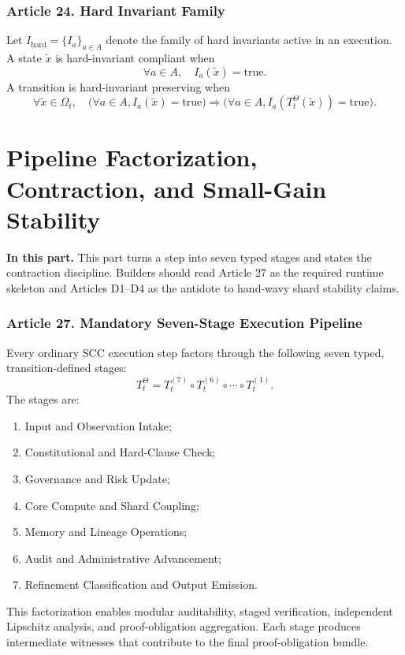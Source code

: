 \documentclass[10pt,oneside]{article}
\theoremstyle{definition}
\theoremstyle{remark}
\newcommand{\PartIntro}[1]{\noindent\textbf{In this part.} #1\par\medskip}
\begin{document}
\section{Article 24. Hard Invariant Family}
Let \(I_{\mathrm{hard}}=\{I_a\}_{a\in A}\) denote the family of hard invariants active in an execution. A state \(\widetilde{x}\) is hard-invariant compliant when
\[
\forall a\in A,\quad I_a(\widetilde{x})=\mathrm{true}.
\]
A transition is hard-invariant preserving when
\[
\forall \widetilde{x}\in\Omega_t,\quad \bigl(\forall a\in A, I_a(\widetilde{x})=\mathrm{true}\bigr)\Longrightarrow \bigl(\forall a\in A, I_a(T_t^\Theta(\widetilde{x}))=\mathrm{true}\bigr).
\]

\part{Pipeline Factorization, Contraction, and Small-Gain Stability}

\PartIntro{This part turns a step into seven typed stages and states the contraction discipline. Builders should read Article 27 as the required runtime skeleton and Articles D1--D4 as the antidote to hand-wavy shard stability claims.}

\section{Article 27. Mandatory Seven-Stage Execution Pipeline}
Every ordinary SCC execution step factors through the following seven typed, transition-defined stages:
\[
T_t^\Theta=T_t^{(7)}\circ T_t^{(6)}\circ\cdots\circ T_t^{(1)}.
\]
The stages are:
\begin{enumerate}
  \item Input and Observation Intake;
  \item Constitutional and Hard-Clause Check;
  \item Governance and Risk Update;
  \item Core Compute and Shard Coupling;
  \item Memory and Lineage Operations;
  \item Audit and Administrative Advancement;
  \item Refinement Classification and Output Emission.
\end{enumerate}
This factorization enables modular auditability, staged verification, independent Lipschitz analysis, and proof-obligation aggregation. Each stage produces intermediate witnesses that contribute to the final proof-obligation bundle.
\end{document}
